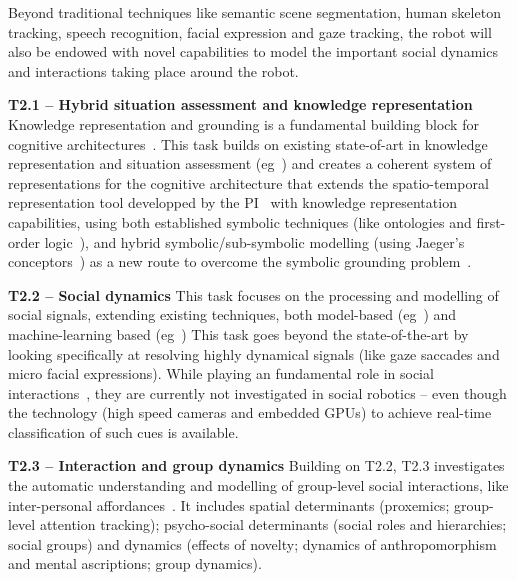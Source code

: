 \documentclass[11pt,a4paper]{report}
\begin{document}
 Beyond traditional
techniques like semantic scene segmentation, human skeleton tracking, speech
recognition, facial expression and gaze tracking, the robot will also be endowed
with novel capabilities to model the important social dynamics and interactions
taking place around the robot.







\textbf{T2.1 -- Hybrid situation assessment and knowledge representation}
Knowledge representation and grounding is a fundamental building block for
cognitive architectures~\cite{lemaignan2017artificial,beetz2010cram}. This task
builds on existing state-of-art in knowledge representation and situation
assessment (eg~\cite{citeneeded}) and creates a coherent system of
representations for the cognitive architecture that extends the 
spatio-temporal representation tool developped by the
PI~\cite{lemaignan2018underworlds,sallami2019simulation} with knowledge
representation capabilities, using both established symbolic techniques (like
ontologies and first-order logic~\cite{lemaignan2010oro, tenorth2009knowrob}),
and hybrid symbolic/sub-symbolic modelling (using Jaeger's
conceptors~\cite{jaeger2014controlling}) as a new route to overcome the symbolic
grounding problem~\cite{harnad1990symbol}.

\textbf{T2.2 -- Social dynamics} This task focuses on the processing and
modelling of social signals, extending existing techniques, both model-based
(eg~\cite{lemaignan2016realtime,others}) and machine-learning based
(eg~\cite{chetouani,others}) This task goes beyond the state-of-the-art by
looking specifically at resolving highly dynamical signals (like gaze saccades
and micro facial expressions). While playing an fundamental role in social
interactions~\cite{citeneeded}, they are currently not investigated in social
robotics -- even though the technology (high speed cameras and embedded GPUs) to
achieve real-time classification of such cues is available.

\textbf{T2.3 -- Interaction and group dynamics} Building on T2.2, T2.3
investigates the automatic understanding and modelling of group-level social
interactions, like inter-personal affordances~\cite{pandey2013affordance}. It
includes spatial determinants (proxemics; group-level attention tracking);
psycho-social determinants (social roles and hierarchies; social groups) and
dynamics (effects of novelty; dynamics of anthropomorphism and mental
ascriptions; group dynamics). 
\end{document}
